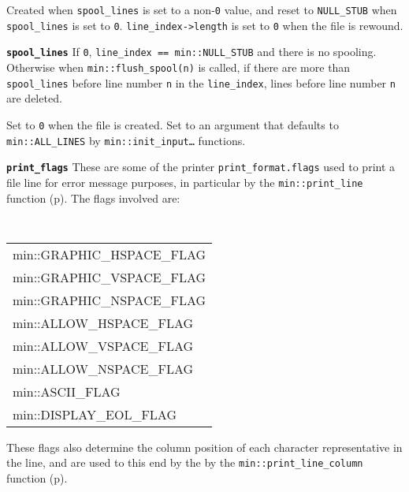\documentclass[12pt]{article}
\makeatletter
\newcommand{\TT}[1]{{\tt \bfseries #1}}
\newcommand{\ttmkey}[2]{\TT{#1}\index{#1@{\tt #1}!#2}}
\newcommand{\pagref}[1]{p\pageref{#1}}
\newcommand{\EOL}{\penalty \exhyphenpenalty}
\newenvironment{indpar}[1][0.3in]%
	{\begin{list}{}%
		     {\setlength{\itemsep}{0in}%
		      \setlength{\topsep}{0in}%
		      \setlength{\parsep}{1ex}%
		      \setlength{\labelwidth}{#1}%
		      \setlength{\leftmargin}{#1}%
		      \addtolength{\leftmargin}{\labelsep}}%
	 \item}%
	{\end{list}}
\newenvironment{itemlist}[1][1.2in]%
	{\begin{list}{}{\setlength{\labelwidth}{#1}%
		        \setlength{\leftmargin}{\labelwidth}%
		        \addtolength{\leftmargin}{+0.2in}%
		        \renewcommand{\makelabel}[1]{##1\hfill}}}%
	{\end{list}}
\makeatother
\begin{document}
\begin{itemlist}[1.4in]
Created when {\tt spool\_\EOL lines} is set to a non-{\tt 0} value,
and reset to {\tt NULL\_STUB} when {\tt spool\_\EOL lines} is set to {\tt 0}.
{\tt line\_\EOL index->\EOL length} is set to {\tt 0}
when the file is rewound.

\item[\ttmkey{spool\_\EOL lines}{in {\tt min::file}}]
If {\tt 0}, {\tt line\_index~==~min::NULL\_STUB} and there is
no spooling.  Otherwise when {\tt min::flush\_spool(n)} is called,
if there are more than {\tt spool\_\EOL lines} before line number
{\tt n} in the {\tt line\_\EOL index}, lines before
line number {\tt n} are deleted.

Set to {\tt 0} when the file is created.  Set to an argument
that defaults to {\tt min::\EOL ALL\_\EOL LINES}
by {\tt min::\EOL init\_\EOL input\ldots} functions.

\item[\ttmkey{print\_\EOL flags}{in {\tt min::file}}]\label{FILE_PRINT_FLAGS}
These are some of the printer {\tt print\_\EOL format.flags} used to print
a file line for error message purposes,
in particular by the {\tt min::\EOL print\_\EOL line}
function (\pagref{MIN::PRINT_LINE}).
The flags involved are:
\begin{indpar}
\tt
\begin{tabular}{l}
min::GRAPHIC\_HSPACE\_FLAG \\
min::GRAPHIC\_VSPACE\_FLAG \\
min::GRAPHIC\_NSPACE\_FLAG \\
min::ALLOW\_HSPACE\_FLAG \\
min::ALLOW\_VSPACE\_FLAG \\
min::ALLOW\_NSPACE\_FLAG \\
min::ASCII\_FLAG \\
min::DISPLAY\_EOL\_FLAG
\end{tabular}
\end{indpar}

These flags also determine the column position of each character representative
in the line, and are used to this end by the
by the {\tt min::\EOL print\_\EOL line\_\EOL column}
function (\pagref{MIN::PRINT_LINE_COLUMN}).


\end{itemlist}
\end{document}
